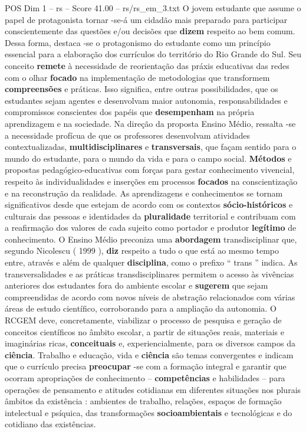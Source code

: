 \begin{textsample}{POS Dim 1 – rs – Score 41.00 – rs/rs\_em\_3.txt}
O jovem estudante que assume o papel de protagonista tornar -se-á um cidadão mais preparado para participar conscientemente das questões e/ou decisões que \textbf{dizem} respeito ao bem comum.
Dessa forma, destaca -se o protagonismo do estudante como um princípio essencial para a elaboração dos currículos do território do Rio Grande do Sul.
Seu conceito \textbf{remete} à necessidade de reorientação das práxis educativas das redes com o olhar \textbf{focado} na implementação de metodologias que transformem \textbf{compreensões} e práticas.
Isso significa, entre outras possibilidades, que os estudantes sejam agentes e desenvolvam maior autonomia, responsabilidades e compromissos conscientes dos papéis que \textbf{desempenham} na própria aprendizagem e na sociedade.
Na direção da proposta Ensino Médio, ressalta -se a necessidade profícua de que os professores desenvolvam atividades contextualizadas, \textbf{multidisciplinares} e \textbf{transversais}, que façam sentido para o mundo do estudante, para o mundo da vida e para o campo social. \textbf{Métodos} e propostas pedagógico-educativas com forças para gestar conhecimento vivencial, respeito às individualidades e inserções em processos \textbf{focados} na conscientização e na reconstrução da realidade.
As aprendizagens e conhecimentos se tornam significativos desde que estejam de acordo com os contextos \textbf{sócio-históricos} e culturais das pessoas e identidades da \textbf{pluralidade} territorial e contribuam com a reafirmação dos valores de cada sujeito como portador e produtor \textbf{legítimo} de conhecimento.
O Ensino Médio preconiza uma \textbf{abordagem} transdisciplinar que, segundo Nicolescu ( 1999 ), \textbf{diz} respeito a tudo o que está ao mesmo tempo entre, através e além de qualquer \textbf{disciplina}, como o prefixo “ trans ” indica.
As transversalidades e as práticas transdisciplinares permitem o acesso às vivências anteriores dos estudantes fora do ambiente escolar e \textbf{sugerem} que sejam compreendidas de acordo com novos níveis de abstração relacionados com várias áreas de estudo científico, corroborando para a ampliação da autonomia.
O RCGEM deve, concretamente, viabilizar o processo de pesquisa e geração de conceitos científicos no âmbito escolar, a partir de situações reais, materiais e imaginárias ricas, \textbf{conceituais} e, experiencialmente, para os diversos campos da \textbf{ciência}.
Trabalho e educação, vida e \textbf{ciência} são temas convergentes e indicam que o currículo precisa \textbf{preocupar} -se com a formação integral e garantir que ocorram apropriações de conhecimento – \textbf{competências} e habilidades – para operações de pensamento e atitudes cotidianas em diferentes situações nos plurais âmbitos da existência : ambientes de trabalho, relações, espaços de formação intelectual e psíquica, das transformações \textbf{socioambientais} e tecnológicas e do cotidiano das existências.

\end{textsample}
